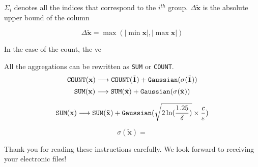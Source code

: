 \documentclass[letterpaper]{article} %
\begin{document}
$\Sigma_i$ denotes all the indices that correspond to the $i^{th}$ group.
$\Delta \tilde{\textbf{x}}$ is the absolute upper bound of the column

\begin{equation}
	{\Delta \tilde{\textbf{x}}} = \max ( |\min \textbf{x}|, |\max \textbf{x}|)
\end{equation}

In the case of the count, the ve

All the aggregations can be rewritten as \texttt{SUM} or \texttt{COUNT}.
\begin{equation}
	\text{\texttt{COUNT}}(\textbf{x}) \longrightarrow \text{\texttt{COUNT}}  (\tilde{\textbf{1}}) + \text{\texttt{Gaussian}} (\sigma(\tilde{\textbf{1}}))
\end{equation}
\begin{equation}
	\text{\texttt{SUM}}(\textbf{x}) \longrightarrow \text{\texttt{SUM}}  (\tilde{\textbf{x}}) + \text{\texttt{Gaussian}} (\sigma(\tilde{\textbf{x}}))
\end{equation}

\begin{equation}
	\text{\texttt{SUM}}(\textbf{x}) \longrightarrow \text{\texttt{SUM}}  (\tilde{\textbf{x}}) + \text{\texttt{Gaussian}} (
	\sqrt{2 \ln (\frac{1.25}{\delta})}\times \frac{c}{\varepsilon})
\end{equation}


\begin{equation}
	\sigma(\tilde{\textbf{x}}) =
\end{equation}

\bigskip
\noindent Thank you for reading these instructions carefully. We look forward to receiving your electronic files!

% 

\end{document}

